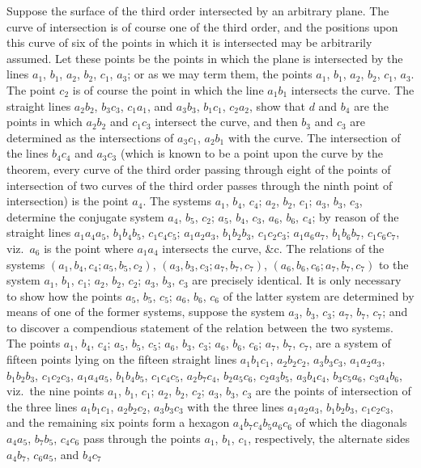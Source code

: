 \documentclass[11pt,a4paper]{article}
\theoremstyle{definition}
\begin{document}
Suppose the surface of the third order intersected by an arbitrary plane. The curve of intersection is of course one of the third order, and the positions upon this curve of six of the points in which it is intersected may be arbitrarily assumed. Let these points be the points in which the plane is intersected by the lines $a_{1}$, $b_{1}$, $a_{2}$, $b_{2}$, $c_{1}$, $a_{3}$; or as we may term them, the points $a_{1}$, $b_{1}$, $a_{2}$, $b_{2}$, $c_{1}$, $a_{3}$. The point $c_{2}$ is of course the point in which the line $a_{1}b_{1}$ intersects the curve. The straight lines $a_{2}b_{2}$, $b_{3}c_{3}$, $c_{1}a_{1}$, and $a_{3}b_{3}$, $b_{1}c_{1}$, $c_{2}a_{2}$, show that $d$ and $b_{4}$ are the points in which $a_{2}b_{2}$ and $c_{1}c_{3}$ intersect the curve, and then $b_{3}$ and $c_{3}$ are determined as the intersections of $a_{3}c_{1}$, $a_{2}b_{1}$ with the curve. The intersection of the lines $b_{4}c_{4}$ and $a_{3}c_{3}$ (which is known to be a point upon the curve by the theorem, every curve of the third order passing through eight of the points of intersection of two curves of the third order passes through the ninth point of intersection) is the point $a_{4}$. The systems $a_{1}$, $b_{4}$, $c_{4}$; $a_{2}$, $b_{2}$, $c_{1}$; $a_{3}$, $b_{3}$, $c_{3}$, determine the conjugate system $a_{4}$, $b_{5}$, $c_{2}$; $a_{5}$, $b_{4}$, $c_{3}$, $a_{6}$, $b_{6}$, $c_{4}$; by reason of the straight lines $a_{1}a_{4}a_{5}$, $b_{1}b_{4}b_{5}$, $c_{1}c_{4}c_{5}$; $a_{1}a_{2}a_{3}$, $b_{1}b_{2}b_{3}$, $c_{1}c_{2}c_{3}$; $a_{1}a_{6}a_{7}$, $b_{1}b_{6}b_{7}$, $c_{1}c_{6}c_{7}$, viz.\ $a_{6}$ is the point where $a_{1}a_{4}$ intersects the curve, \&c. The relations of the systems $(a_{1}, b_{4}, c_{4}; a_{5}, b_{5}, c_{2})$, $(a_{3}, b_{3}, c_{3}; a_{7}, b_{7}, c_{7})$, $(a_{6}, b_{6}, c_{6}; a_{7}, b_{7}, c_{7})$ to the system $a_{1}$, $b_{1}$, $c_{1}$; $a_{2}$, $b_{2}$, $c_{2}$; $a_{3}$, $b_{3}$, $c_{3}$ are precisely identical. It is only necessary to show how the points $a_{5}$, $b_{5}$, $c_{5}$; $a_{6}$, $b_{6}$, $c_{6}$ of the latter system are determined by means of one of the former systems, suppose the system $a_{3}$, $b_{3}$, $c_{3}$; $a_{7}$, $b_{7}$, $c_{7}$; and to discover a compendious statement of the relation between the two systems. The points $a_{1}$, $b_{4}$, $c_{4}$; $a_{5}$, $b_{5}$, $c_{5}$; $a_{6}$, $b_{3}$, $c_{3}$; $a_{6}$, $b_{6}$, $c_{6}$; $a_{7}$, $b_{7}$, $c_{7}$, are a system of fifteen points lying on the fifteen straight lines $a_{1}b_{1}c_{1}$, $a_{2}b_{2}c_{2}$, $a_{3}b_{3}c_{3}$, $a_{1}a_{2}a_{3}$, $b_{1}b_{2}b_{3}$, $c_{1}c_{2}c_{3}$, $a_{1}a_{4}a_{5}$, $b_{1}b_{4}b_{5}$, $c_{1}c_{4}c_{5}$, $a_{2}b_{7}c_{4}$, $b_{2}a_{5}c_{6}$, $c_{2}a_{3}b_{5}$, $a_{3}b_{4}c_{4}$, $b_{3}c_{5}a_{6}$, $c_{3}a_{4}b_{6}$, viz.\ the nine points $a_{1}$, $b_{1}$, $c_{1}$; $a_{2}$, $b_{2}$, $c_{2}$; $a_{3}$, $b_{3}$, $c_{3}$ are the points of intersection of the three lines $a_{1}b_{1}c_{1}$, $a_{2}b_{2}c_{2}$, $a_{3}b_{3}c_{3}$ with the three lines $a_{1}a_{2}a_{3}$, $b_{1}b_{2}b_{3}$, $c_{1}c_{2}c_{3}$, and the remaining six points form a hexagon $a_{4}b_{7}c_{4}b_{5}a_{6}c_{6}$ of which the diagonals $a_{4}a_{5}$, $b_{7}b_{5}$, $c_{4}c_{6}$ pass through the points $a_{1}$, $b_{1}$, $c_{1}$, respectively, the alternate sides $a_{4}b_{7}$, $c_{6}a_{5}$, and $b_{4}c_{7}$ 
\end{document}

